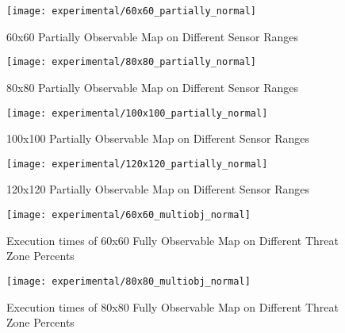 \begin{figure}
\centering
\texttt{[image: experimental/60x60\_partially\_normal]}
\caption{60x60 Partially Observable Map on Different Sensor Ranges}
\label{fig:60x60sensor}
\end{figure}

\begin{figure}
\centering
\texttt{[image: experimental/80x80\_partially\_normal]}
\caption{80x80 Partially Observable Map on Different Sensor Ranges}
\label{fig:80x80sensor}
\end{figure}

\begin{figure}
\centering
\texttt{[image: experimental/100x100\_partially\_normal]}
\caption{100x100 Partially Observable Map on Different Sensor Ranges}
\label{fig:100x100sensor}
\end{figure}

\begin{figure}
\centering
\texttt{[image: experimental/120x120\_partially\_normal]}
\caption{120x120 Partially Observable Map on Different Sensor Ranges}
\label{fig:120x120sensor}
\end{figure}

\begin{figure}
\centering
\texttt{[image: experimental/60x60\_multiobj\_normal]}
\caption{Execution times of 60x60 Fully Observable Map on Different Threat Zone Percents}
\label{fig:tzratio60}
\end{figure}

\begin{figure}
\centering
\texttt{[image: experimental/80x80\_multiobj\_normal]}
\caption{Execution times of 80x80 Fully Observable Map on Different Threat Zone Percents}
\label{fig:tzratio80}
\end{figure}


